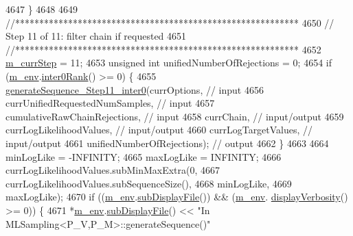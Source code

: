 \begin{DoxyCode}
{{4647     \}
4648 
4649     \textcolor{comment}{//***********************************************************}
4650     \textcolor{comment}{// Step 11 of 11: filter chain if requested}
4651     \textcolor{comment}{//***********************************************************}
4652     \hyperlink{class_q_u_e_s_o_1_1_m_l_sampling_a1b1f8ccb4823bdfa26ec652f0807c63e}{m\_currStep} = 11;
4653     \textcolor{keywordtype}{unsigned} \textcolor{keywordtype}{int} unifiedNumberOfRejections = 0;
4654     \textcolor{keywordflow}{if} (\hyperlink{class_q_u_e_s_o_1_1_m_l_sampling_a13f1ca4fe9f94822fe572a743eaced1d}{m\_env}.\hyperlink{class_q_u_e_s_o_1_1_base_environment_ae106b5bb8a80b655b88b3a26b1e7c185}{inter0Rank}() >= 0) \{
4655       \hyperlink{class_q_u_e_s_o_1_1_m_l_sampling_aae527304bc1012a91ffc396e94fbab11}{generateSequence\_Step11\_inter0}(currOptions,                      \textcolor{comment}{//
       input}
4656                                      currUnifiedRequestedNumSamples,   \textcolor{comment}{// input}
4657                                      cumulativeRawChainRejections,     \textcolor{comment}{// input}
4658                                      currChain,                        \textcolor{comment}{// input/output}
4659                                      currLogLikelihoodValues,          \textcolor{comment}{// input/output}
4660                                      currLogTargetValues,              \textcolor{comment}{// input/output}
4661                                      unifiedNumberOfRejections);       \textcolor{comment}{// output}
4662     \}
4663 
4664     minLogLike = -INFINITY;
4665     maxLogLike =  INFINITY;
4666     currLogLikelihoodValues.subMinMaxExtra(0,
4667                                            currLogLikelihoodValues.subSequenceSize(),
4668                                            minLogLike,
4669                                            maxLogLike);
4670     \textcolor{keywordflow}{if} ((\hyperlink{class_q_u_e_s_o_1_1_m_l_sampling_a13f1ca4fe9f94822fe572a743eaced1d}{m\_env}.\hyperlink{class_q_u_e_s_o_1_1_base_environment_a8a0064746ae8dddfece4229b9ad374d6}{subDisplayFile}()) && (\hyperlink{class_q_u_e_s_o_1_1_m_l_sampling_a13f1ca4fe9f94822fe572a743eaced1d}{m\_env}.
      \hyperlink{class_q_u_e_s_o_1_1_base_environment_a1fe5f244fc0316a0ab3e37463f108b96}{displayVerbosity}() >= 0)) \{
4671       *\hyperlink{class_q_u_e_s_o_1_1_m_l_sampling_a13f1ca4fe9f94822fe572a743eaced1d}{m\_env}.\hyperlink{class_q_u_e_s_o_1_1_base_environment_a8a0064746ae8dddfece4229b9ad374d6}{subDisplayFile}() << \textcolor{stringliteral}{"In MLSampling<P\_V,P\_M>::generateSequence()"}
}}
\end{DoxyCode}
